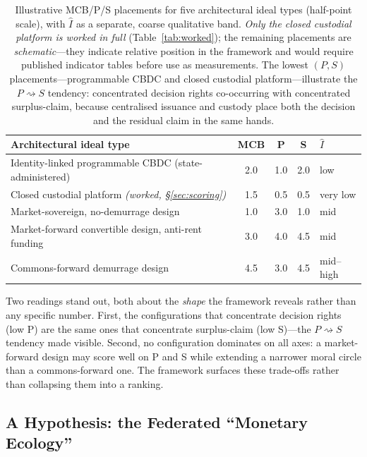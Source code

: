\documentclass[11pt]{article}
\theoremstyle{definition}
\newcommand{\Iax}{\ensuremath{\hat{I}}}
\begin{document}
\begin{table}[!ht]
\centering\small
\renewcommand{\arraystretch}{1.2}
\begin{tabularx}{\textwidth}{@{}Xccc l@{}}
\toprule
\textbf{Architectural ideal type} & \textbf{MCB} & \textbf{P} & \textbf{S} & \textbf{$\Iax$} \\
\midrule
Identity-linked programmable CBDC (state-administered) & 2.0 & 1.0 & 2.0 & low \\
Closed custodial platform \emph{(worked, \S\ref{sec:scoring})} & 1.5 & 0.5 & 0.5 & very low \\
Market-sovereign, no-demurrage design & 1.0 & 3.0 & 1.0 & mid \\
Market-forward convertible design, anti-rent funding & 3.0 & 4.0 & 4.5 & mid \\
Commons-forward demurrage design & 4.5 & 3.0 & 4.5 & mid--high \\
\bottomrule
\end{tabularx}
\caption{Illustrative MCB/P/S placements for five architectural ideal types (half-point
scale), with $\Iax$ as a separate, coarse qualitative band. \emph{Only the closed
custodial platform is worked in full} (Table~\ref{tab:worked}); the remaining
placements are \emph{schematic}---they indicate relative position in the framework and
would require published indicator tables before use as measurements. The lowest
$(P,S)$ placements---programmable CBDC and closed custodial platform---illustrate the
$P \rightsquigarrow S$ tendency: concentrated decision rights co-occurring with
concentrated surplus-claim, because centralised issuance and custody place both the
decision and the residual claim in the same hands.}
\label{tab:types}
\end{table}

Two readings stand out, both about the \emph{shape} the framework reveals rather than
any specific number. First, the configurations that concentrate decision rights (low
P) are the same ones that concentrate surplus-claim (low S)---the $P \rightsquigarrow
S$ tendency made visible. Second, no configuration dominates on all axes: a
market-forward design may score well on P and S while extending a narrower moral
circle than a commons-forward one. The framework surfaces these trade-offs rather
than collapsing them into a ranking.

\subsection{A Hypothesis: the Federated ``Monetary Ecology''}
\end{document}

